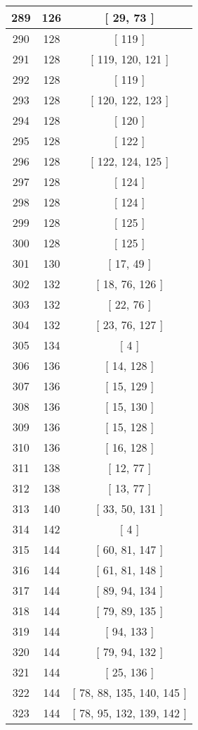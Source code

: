 \begin{center}
\begin{longtable}[H]{|| c c c ||}
\hline
289 & 126 & [ 29, 73 ] \\ 
\hline
290 & 128 & [ 119 ] \\ 
\hline
291 & 128 & [ 119, 120, 121 ] \\ 
\hline
292 & 128 & [ 119 ] \\ 
\hline
293 & 128 & [ 120, 122, 123 ] \\ 
\hline
294 & 128 & [ 120 ] \\ 
\hline
295 & 128 & [ 122 ] \\ 
\hline
296 & 128 & [ 122, 124, 125 ] \\ 
\hline
297 & 128 & [ 124 ] \\ 
\hline
298 & 128 & [ 124 ] \\ 
\hline
299 & 128 & [ 125 ] \\ 
\hline
300 & 128 & [ 125 ] \\ 
\hline
301 & 130 & [ 17, 49 ] \\ 
\hline
302 & 132 & [ 18, 76, 126 ] \\ 
\hline
303 & 132 & [ 22, 76 ] \\ 
\hline
304 & 132 & [ 23, 76, 127 ] \\ 
\hline
305 & 134 & [ 4 ] \\ 
\hline
306 & 136 & [ 14, 128 ] \\ 
\hline
307 & 136 & [ 15, 129 ] \\ 
\hline
308 & 136 & [ 15, 130 ] \\ 
\hline
309 & 136 & [ 15, 128 ] \\ 
\hline
310 & 136 & [ 16, 128 ] \\ 
\hline
311 & 138 & [ 12, 77 ] \\ 
\hline
312 & 138 & [ 13, 77 ] \\ 
\hline
313 & 140 & [ 33, 50, 131 ] \\ 
\hline
314 & 142 & [ 4 ] \\ 
\hline
315 & 144 & [ 60, 81, 147 ] \\ 
\hline
316 & 144 & [ 61, 81, 148 ] \\ 
\hline
317 & 144 & [ 89, 94, 134 ] \\ 
\hline
318 & 144 & [ 79, 89, 135 ] \\ 
\hline
319 & 144 & [ 94, 133 ] \\ 
\hline
320 & 144 & [ 79, 94, 132 ] \\ 
\hline
321 & 144 & [ 25, 136 ] \\ 
\hline
322 & 144 & [ 78, 88, 135, 140, 145 ] \\ 
\hline
323 & 144 & [ 78, 95, 132, 139, 142 ] \\ 

\end{longtable}
\end{center}
